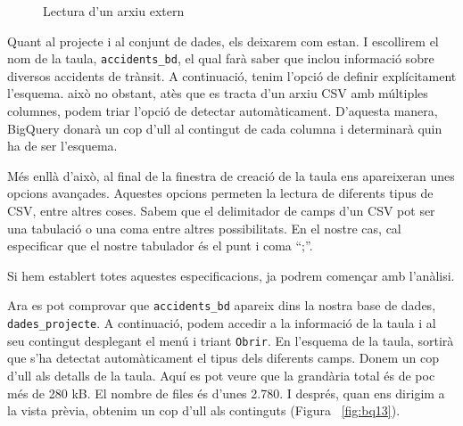\documentclass[12pt,longbibliography]{article}
\theoremstyle{definition}
\theoremstyle{remark}
\begin{document}
\begin{figure}[h!]
\par
{}%
\hfill
{}%
\par

\caption{Lectura d'un arxiu extern}
\label{fig:bq12}
\end{figure}


Quant al projecte i al conjunt de dades, els deixarem com estan. I escollirem el nom de la taula, \verb|accidents_bd|, el qual farà saber que inclou informació sobre diversos accidents de trànsit. A continuació, tenim l'opció de definir explícitament l'esquema. això no obstant, atès que es tracta d'un arxiu CSV amb múltiples columnes, podem triar l'opció de detectar automàticament. D'aquesta manera, BigQuery donarà un cop d'ull al contingut de cada columna i determinarà quin ha de ser l'esquema. 



Més enllà d'això, al final de la finestra de creació de la taula ens apareixeran unes opcions avançades. Aquestes opcions permeten la lectura de diferents tipus de CSV, entre altres coses. Sabem que el delimitador de camps d’un CSV pot ser una tabulació o una coma entre altres possibilitats. En el nostre cas, cal especificar que el nostre tabulador és el punt i coma “;”. 



Si hem establert totes aquestes especificacions, ja podrem començar amb l’anàlisi.



Ara es pot comprovar que \verb|accidents_bd| apareix dins la nostra base de dades, \verb|dades_projecte|. A continuació, podem accedir a la informació de la taula i al seu contingut desplegant el menú i triant \texttt{Obrir}. En l'esquema de la taula, sortirà que s'ha detectat automàticament el tipus dels diferents camps. Donem un cop d'ull als detalls de la taula. Aquí es pot veure que la grandària total és de poc més de 280 kB. El nombre de files és d'unes 2.780. I després, quan ens dirigim a la vista prèvia, obtenim un cop d'ull als continguts (Figura ~\ref{fig:bq13}). 
\end{document}
